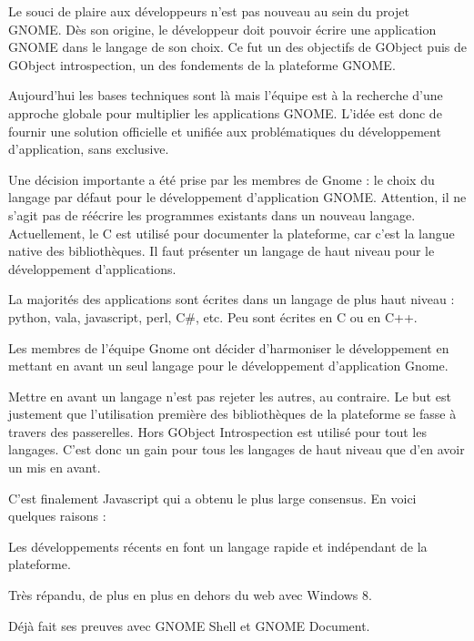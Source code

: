 Le souci de plaire aux développeurs n'est pas nouveau au sein du projet GNOME. Dès son origine, le développeur doit pouvoir écrire une application GNOME dans le langage de son choix. Ce fut un des objectifs de GObject puis de GObject introspection, un des fondements de la plateforme GNOME.

Aujourd'hui les bases techniques sont là mais l'équipe est à la recherche d'une approche globale pour multiplier les applications GNOME. L'idée est donc de fournir une solution officielle et unifiée aux problématiques du développement d'application, sans exclusive.

Une décision importante a été prise par les membres de Gnome : le choix du langage par défaut pour le développement d'application GNOME. Attention, il ne s'agit pas de réécrire les programmes existants dans un nouveau langage. Actuellement, le C est utilisé pour documenter la plateforme, car c'est la langue native des bibliothèques. Il faut présenter un langage de haut niveau pour le développement d'applications.

La majorités des applications sont écrites dans un langage de plus haut niveau : python, vala, javascript, perl, C\#, etc. Peu sont écrites en C ou en C++.

Les membres de l'équipe Gnome ont décider d'harmoniser le développement en mettant en avant un seul langage pour le développement d'application Gnome.

Mettre en avant un langage n'est pas rejeter les autres, au contraire. Le but est justement que l'utilisation première des bibliothèques de la plateforme se fasse à travers des passerelles. Hors GObject Introspection est utilisé pour tout les langages. C'est donc un gain pour tous les langages de haut niveau que d'en avoir un mis en avant.

C'est finalement Javascript qui a obtenu le plus large consensus. En voici quelques raisons :

\begin{list}{•}{}
 
  \item
  Les développements récents en font un langage rapide et indépendant de la plateforme.

  \item
  Très répandu, de plus en plus en dehors du web avec Windows 8.

  \item
  Déjà fait ses preuves avec GNOME Shell et GNOME Document.


\end{list}

